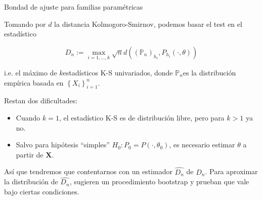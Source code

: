 \documentclass[10pt,spanish]{beamer}\usepackage[]{graphicx}\usepackage[]{color}
\begin{document}
\begin{frame}{Bondad de ajuste para familias paramétricas}

Tomando por $d$ la distancia Kolmogoro-Smirnov, podemos basar el
test en el estadístico

\[
D_{n}:=\max_{i=1,\ldots,k}\sqrt{n}d\left(\left(\mathbb{P}_{n}\right)_{h_{i}},P_{h_{i}}(\cdot,\theta)\right)
\]

i.e. el máximo de $k$estadísticos K-S univariados, donde $\mathbb{P}_{n}$es
la distribución empírica basada en $\left\{ X_{i}\right\} _{i=1}^{n}$.

\pause{}

Restan dos dificultades:
\begin{itemize}
\item Cuando $k=1$, el estadístico K-S es de distribución libre, pero para
$k>1$ ya no.
\end{itemize}

\pause{}
\begin{itemize}
\item Salvo para hipótesis “simples” $H_{0}:P_{0}=P\left(\cdot,\theta_{0}\right)$,
es necesario estimar $\theta$ a partir de $\mathbf{X}$.
\end{itemize}

\pause{}

Así que tendremos que contentarnos con un estimador $\hat{D_{n}}$
de $D_{n}$. Para aproximar la distribución de $\hat{D_{n}}$, sugieren
un procedimiento bootstrap y prueban que vale bajo ciertas condiciones.
\end{frame}
%
\end{document}
